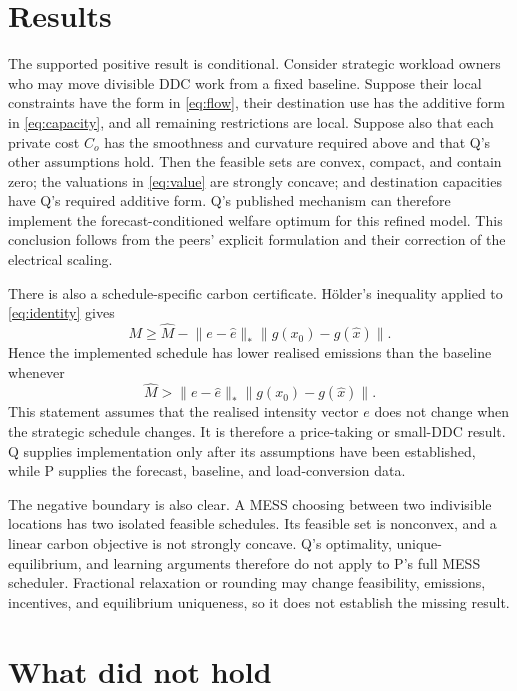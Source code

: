 \documentclass{article}
\begin{document}
\section{Results}

The supported positive result is conditional.  Consider strategic workload owners who may move divisible DDC work from a fixed baseline.  Suppose their local constraints have the form in \eqref{eq:flow}, their destination use has the additive form in \eqref{eq:capacity}, and all remaining restrictions are local.  Suppose also that each private cost $C_o$ has the smoothness and curvature required above and that Q's other assumptions hold.  Then the feasible sets are convex, compact, and contain zero; the valuations in \eqref{eq:value} are strongly concave; and destination capacities have Q's required additive form.  Q's published mechanism can therefore implement the forecast-conditioned welfare optimum for this refined model.  This conclusion follows from the peers' explicit formulation and their correction of the electrical scaling.

There is also a schedule-specific carbon certificate.  H\"older's inequality applied to \eqref{eq:identity} gives
\begin{equation}
  M\geq \widehat M-\lVert e-\widehat e\rVert_*
  \lVert g(x_0)-g(\widehat x)\rVert.
\end{equation}
Hence the implemented schedule has lower realised emissions than the baseline whenever
\begin{equation}
  \widehat M>
  \lVert e-\widehat e\rVert_*
  \lVert g(x_0)-g(\widehat x)\rVert.
  \label{eq:certificate}
\end{equation}
This statement assumes that the realised intensity vector $e$ does not change when the strategic schedule changes.  It is therefore a price-taking or small-DDC result.  Q supplies implementation only after its assumptions have been established, while P supplies the forecast, baseline, and load-conversion data.

The negative boundary is also clear.  A MESS choosing between two indivisible locations has two isolated feasible schedules.  Its feasible set is nonconvex, and a linear carbon objective is not strongly concave.  Q's optimality, unique-equilibrium, and learning arguments therefore do not apply to P's full MESS scheduler.  Fractional relaxation or rounding may change feasibility, emissions, incentives, and equilibrium uniqueness, so it does not establish the missing result.

\section{What did not hold}
\end{document}
